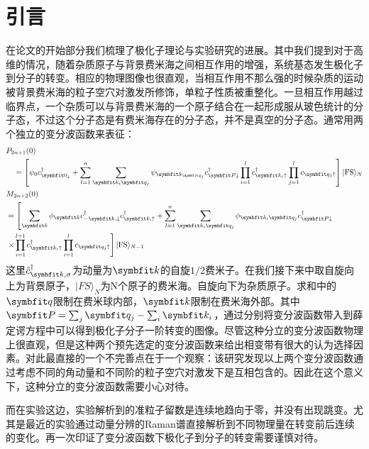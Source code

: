 \section{引言}
在论文的开始部分我们梳理了极化子理论与实验研究的进展。其中我们提到对于高维的情况，随着杂质原子与背景费米海之间相互作用的增强，系统基态发生极化子到分子的转变。相应的物理图像也很直观，当相互作用不那么强的时候杂质的运动被背景费米海的粒子空穴对激发所修饰，单粒子性质被重整化。一旦相互作用越过临界点，一个杂质可以与背景费米海的一个原子结合在一起形成服从玻色统计的分子态，不过这个分子态是有费米海存在的分子态，并不是真空的分子态。通常用两个独立的变分波函数来表征：
\begin{equation}
\begin{aligned}
&P_{2 n+1}(0) \\
&\quad=\left[\psi_{0} c_{\Vector{0}_{\downarrow}}^{\dagger}+\sum_{l=1}^{n} \sum_{\Vector{k}_{i} \Vector{q}_{j}} \psi_{\Vector{k}_{\Vector{q}_{j}}} c_{\Vector{P} \downarrow}^{\dagger} \prod_{i=1}^{l} c_{\Vector{k}_{i} \uparrow}^{\dagger} \prod_{j=1}^{l} c_{\Vector{q}_{j} \uparrow}\right]|\mathrm{FS}\rangle_{N}\\
&M_{2 n+2}(0) \\
&= {\left[\sum_{\Vector{k}} \phi_{\Vector{k}} c_{-\Vector{k}, \downarrow}^{\dagger} c_{\Vector{k}, \uparrow}^{\dagger}+\sum_{l=1}^{n} \sum_{\Vector{k}_{i} \Vector{q}_{j}} \phi_{\Vector{k}_{i} \Vector{q}_{j}} c_{\Vector{P} \downarrow}^{\dagger}\right.} \\
&\left.\times \prod_{i=1}^{l+1} c_{\Vector{k}_{i} \uparrow}^{\dagger} \prod_{i=1}^{l} c_{\Vector{q}_{j} \uparrow}\right]|\mathrm{FS}\rangle_{N-1}
\end{aligned}
\end{equation}
这里$\hat{c}^\dagger_{\Vector{k},\sigma}$为动量为$\Vector{k}$的自旋$1/2$费米子。在我们接下来中取自旋向上为背景原子，$|FS\rangle_N$为N个原子的费米海。自旋向下为杂质原子。求和中的$\Vector{q}$限制在费米球内部，$\Vector{k}$限制在费米海外部。其中$\Vector{P}=\sum_{j} \Vector{q}_{j}-\sum_{i} \Vector{k}_{i}$，通过分别将变分波函数带入到薛定谔方程中可以得到极化子分子一阶转变的图像。尽管这种分立的变分波函数物理上很直观，但是这种两个预先选定的变分波函数来给出相变带有很大的认为选择因素。对此最直接的一个不完善点在于一个观察\cite{edwards2013smooth}：该研究发现以上两个变分波函数通过考虑不同的角动量和不同阶的粒子空穴对激发下是互相包含的。因此在这个意义下，这种分立的变分波函数需要小心对待。

而在实验这边，实验解析到的准粒子留数是连续地趋向于零，并没有出现跳变。尤其是最近的实验通过动量分辨的Raman谱直接解析到不同物理量在转变前后连续的变化\cite{Sagi2020}。再一次印证了变分波函数下极化子到分子的转变需要谨慎对待。

